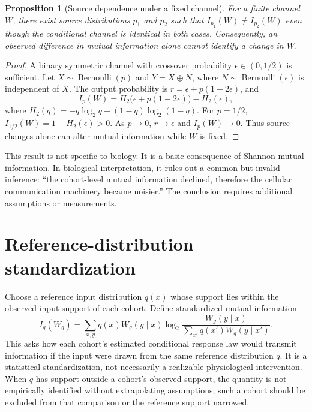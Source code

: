 \documentclass[11pt]{article}
\newtheorem{proposition}{Proposition}
\begin{document}
\begin{proposition}[Source dependence under a fixed channel]
For a finite channel $W$, there exist source distributions $p_1$ and $p_2$ such that $I_{p_1}(W)\neq I_{p_2}(W)$ even though the conditional channel is identical in both cases. Consequently, an observed difference in mutual information alone cannot identify a change in $W$.
\end{proposition}
\begin{proof}
A binary symmetric channel with crossover probability $\epsilon\in(0,1/2)$ is sufficient. Let $X\sim\operatorname{Bernoulli}(p)$ and $Y=X\oplus N$, where $N\sim\operatorname{Bernoulli}(\epsilon)$ is independent of $X$. The output probability is $r=\epsilon+p(1-2\epsilon)$, and
\begin{equation}
I_p(W)=H_2\bigl(\epsilon+p(1-2\epsilon)\bigr)-H_2(\epsilon),
\label{eq:bscmi}
\end{equation}
where $H_2(q)=-q\log_2q-(1-q)\log_2(1-q)$. For $p=1/2$, $I_{1/2}(W)=1-H_2(\epsilon)>0$. As $p\to0$, $r\to\epsilon$ and $I_p(W)\to0$. Thus source changes alone can alter mutual information while $W$ is fixed.\end{proof}

This result is not specific to biology. It is a basic consequence of Shannon mutual information. In biological interpretation, it rules out a common but invalid inference: “the cohort-level mutual information declined, therefore the cellular communication machinery became noisier.” The conclusion requires additional assumptions or measurements.

\section{Reference-distribution standardization}
Choose a reference input distribution $q(x)$ whose support lies within the observed input support of each cohort. Define standardized mutual information
\begin{equation}
I_q(W_g)=\sum_{x,y}q(x)W_g(y\mid x)\log_2\frac{W_g(y\mid x)}{\sum_{x'}q(x')W_g(y\mid x')}.
\label{eq:standardized}
\end{equation}
This asks how each cohort's estimated conditional response law would transmit information if the input were drawn from the same reference distribution $q$. It is a statistical standardization, not necessarily a realizable physiological intervention. When $q$ has support outside a cohort's observed support, the quantity is not empirically identified without extrapolating assumptions; such a cohort should be excluded from that comparison or the reference support narrowed.
\end{document}
